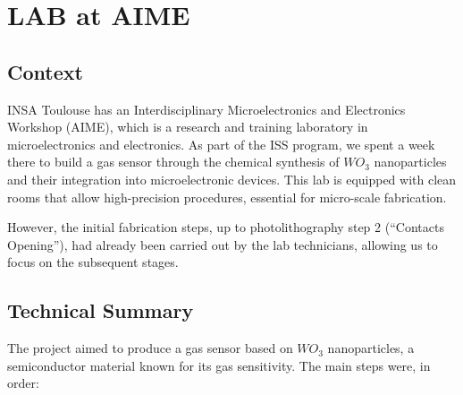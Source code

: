 

\section{LAB at AIME}

\subsection{Context}

\indent \indent INSA Toulouse has an Interdisciplinary Microelectronics and Electronics Workshop (AIME), which is a research and training laboratory in microelectronics and electronics. As part of the ISS program, we spent a week there to build a gas sensor through the chemical synthesis of $WO_3$ nanoparticles and their integration into microelectronic devices. This lab is equipped with clean rooms that allow high-precision procedures, essential for micro-scale fabrication.
\vspace{0.25cm}

\noindent However, the initial fabrication steps, up to photolithography step 2 (“Contacts Opening”), had already been carried out by the lab technicians, allowing us to focus on the subsequent stages.

\subsection{Technical Summary}

The project aimed to produce a gas sensor based on $WO_3$ nanoparticles, a semiconductor material known for its gas sensitivity. The main steps were, in order:

